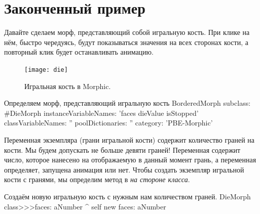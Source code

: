 \documentclass[a4paper,10pt,twoside]{book}
\begin{document}
\section{Законченный пример}

Давайте сделаем морф, представляющий собой игральную кость. При клике на нём, быстро чередуясь, будут показываться значения на всех сторонах кости, а повторный клик будет останавливать анимацию.

\begin{figure}[ht]
	\centerline{\texttt{[image: die]}}
	\caption{Игральная кость в Morphic.
		}
\end{figure}


\begin{classdef}{Определяем морф, представляющий игральную кость}
BorderedMorph subclass: #DieMorph
	instanceVariableNames: 'faces dieValue isStopped'
	classVariableNames: ''
	poolDictionaries: ''
	category: 'PBE-Morphic'
\end{classdef}

Переменная экземпляра  (грани игральной кости) содержит количество граней на кости. Мы будем допускать не больше девяти граней! Переменная  содержит число, которое нанесено на отображаемую в данный момент грань, а переменная  определяет, запущена анимация или нет.
Чтобы создать экземпляр игральной кости с  гранями, мы определим метод  в  \emph{на стороне класса}. 
\begin{method}{Создаём новую игральную кость с нужным нам количеством граней.}
DieMorph class>>>faces: aNumber
	^ self new faces: aNumber
\end{method}
\end{document}
